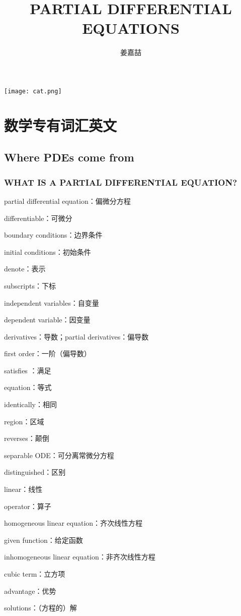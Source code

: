 \documentclass[hazy,blue,11pt]{elegantnote}
\title{PARTIAL DIFFERENTIAL EQUATIONS}
\author{{\CJKfontspec{SIMSUN.ttf} 姜嘉喆}}
\date{\zhtoday}
\begin{document}
    
\maketitle

\centerline{
  \texttt{[image: cat.png]}
}
\section{数学专有词汇英文}

\subsection{Where PDEs come from}
\subsubsection{WHAT IS A PARTIAL DIFFERENTIAL EQUATION?}
    partial differential equation：偏微分方程

    differentiable：可微分
    
    boundary conditions：边界条件
    
    initial conditions：初始条件

    denote：表示

    subscripts：下标

    independent variables：自变量

    dependent variable：因变量

    derivatives：导数；partial derivatives：偏导数

    first order：一阶（偏导数）

    satisfies ：满足

    equation：等式
    
    identically：相同

    region：区域

    reverses：颠倒

    separable ODE：可分离常微分方程

    distinguished：区别

    linear：线性

    operator：算子

    homogeneous linear equation：齐次线性方程

    given function：给定函数

    inhomogeneous linear equation：非齐次线性方程

    cubic term：立方项

    advantage：优势

    solutions：（方程的）解
\end{document}

